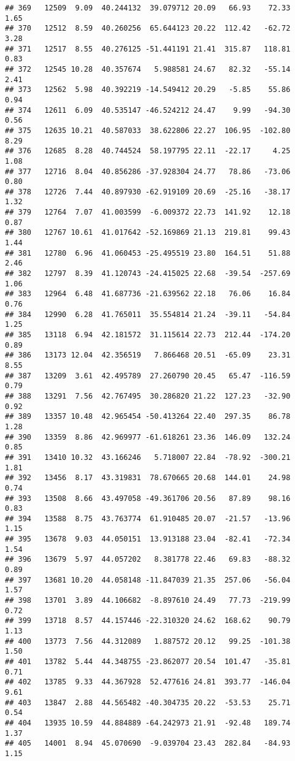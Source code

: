 \documentclass[]{article}
\begin{document}
\begin{verbatim}
## 369   12509  9.09  40.244132  39.079712 20.09   66.93    72.33  1.65
## 370   12512  8.59  40.260256  65.644123 20.22  112.42   -62.72  3.28
## 371   12517  8.55  40.276125 -51.441191 21.41  315.87   118.81  0.83
## 372   12545 10.28  40.357674   5.988581 24.67   82.32   -55.14  2.41
## 373   12562  5.98  40.392219 -14.549412 20.29   -5.85    55.86  0.94
## 374   12611  6.09  40.535147 -46.524212 24.47    9.99   -94.30  0.56
## 375   12635 10.21  40.587033  38.622806 22.27  106.95  -102.80  8.29
## 376   12685  8.28  40.744524  58.197795 22.11  -22.17     4.25  1.08
## 377   12716  8.04  40.856286 -37.928304 24.77   78.86   -73.06  0.80
## 378   12726  7.44  40.897930 -62.919109 20.69  -25.16   -38.17  1.32
## 379   12764  7.07  41.003599  -6.009372 22.73  141.92    12.18  0.87
## 380   12767 10.61  41.017642 -52.169869 21.13  219.81    99.43  1.44
## 381   12780  6.96  41.060453 -25.495519 23.80  164.51    51.88  2.46
## 382   12797  8.39  41.120743 -24.415025 22.68  -39.54  -257.69  1.06
## 383   12964  6.48  41.687736 -21.639562 22.18   76.06    16.84  0.76
## 384   12990  6.28  41.765011  35.554814 21.24  -39.11   -54.84  1.25
## 385   13118  6.94  42.181572  31.115614 22.73  212.44  -174.20  0.89
## 386   13173 12.04  42.356519   7.866468 20.51  -65.09    23.31  8.55
## 387   13209  3.61  42.495789  27.260790 20.45   65.47  -116.59  0.79
## 388   13291  7.56  42.767495  30.286820 21.22  127.23   -32.90  0.92
## 389   13357 10.48  42.965454 -50.413264 22.40  297.35    86.78  1.28
## 390   13359  8.86  42.969977 -61.618261 23.36  146.09   132.24  0.85
## 391   13410 10.32  43.166246   5.718007 22.84  -78.92  -300.21  1.81
## 392   13456  8.17  43.319831  78.670665 20.68  144.01    24.98  0.74
## 393   13508  8.66  43.497058 -49.361706 20.56   87.89    98.16  0.83
## 394   13588  8.75  43.763774  61.910485 20.07  -21.57   -13.96  1.15
## 395   13678  9.03  44.050151  13.913188 23.04  -82.41   -72.34  1.54
## 396   13679  5.97  44.057202   8.381778 22.46   69.83   -88.32  0.89
## 397   13681 10.20  44.058148 -11.847039 21.35  257.06   -56.04  1.57
## 398   13701  3.89  44.106682  -8.897610 24.49   77.73  -219.99  0.72
## 399   13718  8.57  44.157446 -22.310320 24.62  168.62    90.79  1.13
## 400   13773  7.56  44.312089   1.887572 20.12   99.25  -101.38  1.50
## 401   13782  5.44  44.348755 -23.862077 20.54  101.47   -35.81  0.71
## 402   13785  9.33  44.367928  52.477616 24.81  393.77  -146.04  9.61
## 403   13847  2.88  44.565482 -40.304735 20.22  -53.53    25.71  0.54
## 404   13935 10.59  44.884889 -64.242973 21.91  -92.48   189.74  1.37
## 405   14001  8.94  45.070690  -9.039704 23.43  282.84   -84.93  1.15

\end{verbatim}
\end{document}
